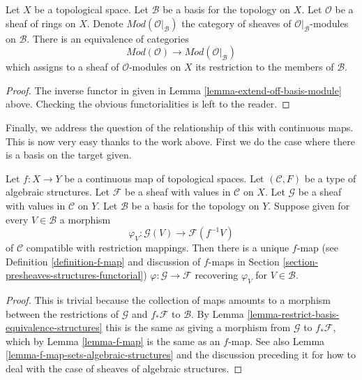 \begin{lemma}
\label{lemma-restrict-basis-equivalence-modules}
Let $X$ be a topological space.
Let $\mathcal{B}$ be a basis for the topology on $X$.
Let $\mathcal{O}$ be a sheaf of rings on $X$.
Denote $\textit{Mod}(\mathcal{O}|_\mathcal{B})$ the category of
sheaves of $\mathcal{O}|_\mathcal{B}$-modules on $\mathcal{B}$.
There is an equivalence of categories
$$
\textit{Mod}(\mathcal{O})
\longrightarrow
\textit{Mod}(\mathcal{O}|_\mathcal{B})
$$
which assigns to a sheaf of $\mathcal{O}$-modules on $X$ its restriction to
the members of $\mathcal{B}$.
\end{lemma}

\begin{proof}
The inverse functor in given in
Lemma \ref{lemma-extend-off-basis-module} above.
Checking the obvious functorialities is left to the reader.
\end{proof}

\noindent
Finally, we address the question of the relationship of this with
continuous maps. This is now very easy thanks to the work
above. First we do the case where there is a basis on the
target given.

\begin{lemma}
\label{lemma-f-map-basis-below-structures}
Let $f : X \to Y$ be a continuous map of topological spaces.
Let $(\mathcal{C}, F)$ be a type of algebraic structures.
Let $\mathcal{F}$ be a sheaf with values in $\mathcal{C}$ on $X$.
Let $\mathcal{G}$ be a sheaf with values in $\mathcal{C}$ on $Y$.
Let $\mathcal{B}$ be a basis for the topology on $Y$.
Suppose given for every $V \in \mathcal{B}$ a morphism
$$
\varphi_V :
\mathcal{G}(V)
\longrightarrow
\mathcal{F}(f^{-1}V)
$$
of $\mathcal{C}$ compatible with restriction mappings.
Then there is a unique $f$-map (see Definition \ref{definition-f-map}
and discussion of $f$-maps in
Section \ref{section-presheaves-structures-functorial})
$\varphi : \mathcal{G} \to \mathcal{F}$
recovering $\varphi_V$ for $V \in \mathcal{B}$.
\end{lemma}

\begin{proof}
This is trivial because the collection of maps
amounts to a morphism between the restrictions
of $\mathcal{G}$ and $f_*\mathcal{F}$ to $\mathcal{B}$.
By Lemma \ref{lemma-restrict-basis-equivalence-structures}
this is the same as giving a morphism from $\mathcal{G}$
to $f_*\mathcal{F}$, which by Lemma \ref{lemma-f-map}
is the same as an $f$-map. See also
Lemma \ref{lemma-f-map-sets-algebraic-structures}
and the discussion preceding it
for how to deal with the case of sheaves of algebraic structures.
\end{proof}

